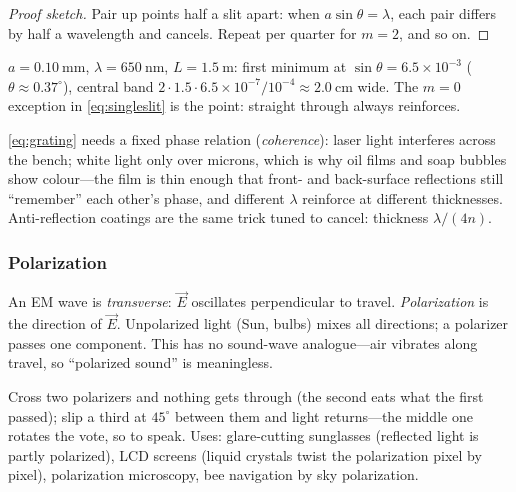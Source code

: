 \begin{proof}[Proof sketch]
Pair up points half a slit apart: when $a\sin\theta = \lambda$, each pair differs by half a wavelength and cancels. Repeat per quarter for $m = 2$, and so on. \qedhere
\end{proof}

\begin{example}\label{exm:singleslit}
$a = 0.10\ \mathrm{mm}$, $\lambda = 650\ \mathrm{nm}$, $L = 1.5\ \mathrm{m}$: first minimum at $\sin\theta = 6.5\times 10^{-3}$ ($\theta \approx 0.37^\circ$), central band $2\cdot 1.5\cdot 6.5\times 10^{-7}/10^{-4} \approx 2.0\ \mathrm{cm}$ wide. The $m = 0$ exception in \cref{eq:singleslit} is the point: straight through always reinforces.
\end{example}

\begin{remark}\label{rmk:coherence}
\cref{eq:grating} needs a fixed phase relation (\emph{coherence}): laser light interferes across the bench; white light only over microns, which is why oil films and soap bubbles show colour---the film is thin enough that front- and back-surface reflections still ``remember'' each other's phase, and different $\lambda$ reinforce at different thicknesses. Anti-reflection coatings are the same trick tuned to cancel: thickness $\lambda/(4n)$.
\end{remark}

\subsubsection{Polarization}

\begin{definition}[Polarization]\label{def:polarization}
An EM wave is \emph{transverse}: $\vec{E}$ oscillates perpendicular to travel. \emph{Polarization} is the direction of $\vec{E}$. Unpolarized light (Sun, bulbs) mixes all directions; a polarizer passes one component. This has no sound-wave analogue---air vibrates along travel, so ``polarized sound'' is meaningless.
\end{definition}

Cross two polarizers and nothing gets through (the second eats what the first passed); slip a third at $45^\circ$ between them and light returns---the middle one rotates the vote, so to speak. Uses: glare-cutting sunglasses (reflected light is partly polarized), LCD screens (liquid crystals twist the polarization pixel by pixel), polarization microscopy, bee navigation by sky polarization.

